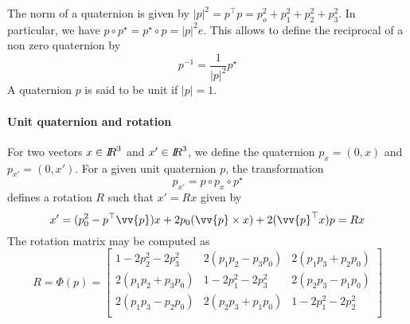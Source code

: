 The norm of a quaternion is given by $|p|^2=p^\top p = p_o^2+p_1^2+p_2^2+p_3^2$. In particular, we have $p \circ p^\star = p^\star \circ p = |p|^2 e$. This allows to define the reciprocal of a non zero quaternion by
\begin{equation}
  \label{eq:78}
  p ^{-1} = \frac 1 {|p|^2} p^\star
\end{equation}
A quaternion $p$ is said to be unit if $|p| =1$. 

\paragraph{Unit quaternion and rotation}
For two vectors $x\in \mbox{\rm $I\!\!R$}^3$ and $x'\in \mbox{\rm $I\!\!R$}^3$, we define the quaternion $p_x = (0,x)$ and  $p_{x'} = (0,x')$.
For a given unit quaternion $p$, the transformation
\begin{equation}
  \label{eq:79}
  p_{x'} = p \circ p_x \circ  p^\star 
\end{equation}
defines a rotation $R$ such that $x'  = R x$ given by
\begin{equation}
  \label{eq:80}
  x' = (p_0^2- p^\top \vv{p}) x +2 p_0(\vv{p}\times x) +  2 (\vv{p}^\top x) p = R x
\end{equation}
The rotation matrix may be computed as 
\begin{equation}
  \label{eq:81}
  R = \Phi(p) =
  \begin{bmatrix}
    1-2 p_2^2- 2 p_3^2 & 2(p_1p_2-p_3p_0) & 2(p_1p_3+p_2p_0)\\
    2(p_1p_2+p_3p_0) & 1-2 p_1^2- 2 p_3^2 & 2(p_2p_3-p_1p_0)\\
    2(p_1p_3-p_2p_0) & 2(p_2p_3+p_1p_0)  & 1-2 p_1^2- 2 p_2^2\\
  \end{bmatrix}
\end{equation} 



